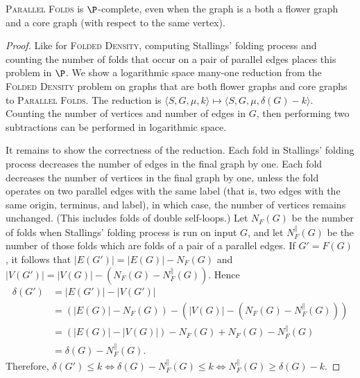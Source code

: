 \documentclass{article}
\newcommand{\FD}{\textsc{Folded Density}}
\newcommand{\PFolds}{\textsc{Parallel Folds}}
\begin{document}
\begin{theorem}
  \PFolds{} is $\P$-complete, even when the graph is a both a flower graph and a core graph (with respect to the same vertex).
\end{theorem}
\begin{proof}
  Like for \FD, computing Stallings' folding process and counting the number of folds that occur on a pair of parallel edges places this problem in $\P$.
  We show a logarithmic space many-one reduction from the \FD{} problem on graphs that are both flower graphs and core graphs to \PFolds{}.
  The reduction is $\langle S, G, \mu, k \rangle \mapsto \langle S, G, \mu, \delta(G) - k \rangle$.
  Counting the number of vertices and number of edges in $G$, then performing two subtractions can be performed in logarithmic space.

  It remains to show the correctness of the reduction.
  Each fold in Stallings' folding process decreases the number of edges in the final graph by one.
  Each fold decreases the number of vertices in the final graph by one, unless the fold operates on two parallel edges with the same label (that is, two edges with the same origin, terminus, and label), in which case, the number of vertices remains unchanged.
  (This includes folds of double self-loops.)
  Let $N_F(G)$ be the number of folds when Stallings' folding process is run on input $G$, and let $N^\|_F(G)$ be the number of those folds which are folds of a pair of a parallel edges.
  If $G' = F(G)$, it follows that $|E(G')| = |E(G)| - N_F(G)$ and $|V(G')| = |V(G)| - (N_F(G) - N^\|_F(G))$.
  Hence
  \begin{align*}
    \delta(G') & = |E(G')| - |V(G')| \\
    & = (|E(G)| - N_F(G)) - (|V(G)| - (N_F(G) - N^\|_F(G))) \\
    & = (|E(G)| - |V(G)|) - N_F(G) + N_F(G) - N^\|_F(G) \\
    & = \delta(G) - N^\|_F(G).
  \end{align*}
  Therefore, $\delta(G') \leq k \iff \delta(G) - N^\|_F(G) \leq k \iff N^\|_F(G) \geq \delta(G) - k$.
\end{proof}
\end{document}

